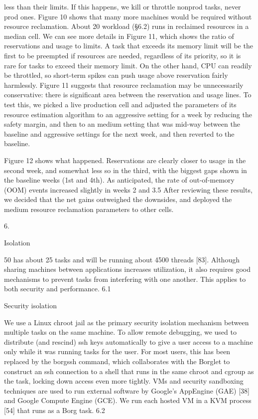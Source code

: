 less than their limits. If this happens, we kill or throttle nonprod tasks, never prod ones.
Figure 10 shows that many more machines would be
required without resource reclamation. About 20%
workload (§6.2) runs in reclaimed resources in a median cell.
We can see more details in Figure 11, which shows the
ratio of reservations and usage to limits. A task that exceeds
its memory limit will be the first to be preempted if resources
are needed, regardless of its priority, so it is rare for tasks
to exceed their memory limit. On the other hand, CPU can
readily be throttled, so short-term spikes can push usage
above reservation fairly harmlessly.
Figure 11 suggests that resource reclamation may be unnecessarily conservative: there is significant area between
the reservation and usage lines. To test this, we picked a live
production cell and adjusted the parameters of its resource
estimation algorithm to an aggressive setting for a week by
reducing the safety margin, and then to an medium setting
that was mid-way between the baseline and aggressive settings for the next week, and then reverted to the baseline.


Figure 12 shows what happened. Reservations are clearly
closer to usage in the second week, and somewhat less so in
the third, with the biggest gaps shown in the baseline weeks
(1st and 4th). As anticipated, the rate of out-of-memory
(OOM) events increased slightly in weeks 2 and 3.5 After
reviewing these results, we decided that the net gains outweighed the downsides, and deployed the medium resource
reclamation parameters to other cells.

6.

Isolation

50%
has about 25 tasks and will be running about 4500 threads
[83]. Although sharing machines between applications increases utilization, it also requires good mechanisms to prevent tasks from interfering with one another. This applies to
both security and performance.
6.1

Security isolation

We use a Linux chroot jail as the primary security isolation
mechanism between multiple tasks on the same machine. To
allow remote debugging, we used to distribute (and rescind)
ssh keys automatically to give a user access to a machine
only while it was running tasks for the user. For most users,
this has been replaced by the borgssh command, which collaborates with the Borglet to construct an ssh connection to
a shell that runs in the same chroot and cgroup as the task,
locking down access even more tightly.
VMs and security sandboxing techniques are used to run
external software by Google’s AppEngine (GAE) [38] and
Google Compute Engine (GCE). We run each hosted VM in
a KVM process [54] that runs as a Borg task.
6.2

